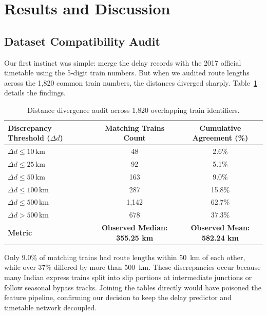 \documentclass[11pt,a4paper]{article}
\begin{document}
\section{Results and Discussion}

\subsection{Dataset Compatibility Audit}
Our first instinct was simple: merge the delay records with the 2017 official timetable using the 5-digit train numbers. But when we audited route lengths across the 1,820 common train numbers, the distances diverged sharply. Table~\ref{tab:compatibility_audit} details the findings.

\begin{table}[!ht]
\centering
\small
\caption{Distance divergence audit across 1,820 overlapping train identifiers.}
\label{tab:compatibility_audit}
\begin{tabularx}{\textwidth}{lcc}
\toprule
\textbf{Discrepancy Threshold ($\Delta d$)} & \textbf{Matching Trains Count} & \textbf{Cumulative Agreement (\%)} \\
\midrule
$\Delta d \le 10\,\mathrm{km}$ & 48 & 2.6\% \\
$\Delta d \le 25\,\mathrm{km}$ & 92 & 5.1\% \\
$\Delta d \le 50\,\mathrm{km}$ & 163 & 9.0\% \\
$\Delta d \le 100\,\mathrm{km}$ & 287 & 15.8\% \\
$\Delta d \le 500\,\mathrm{km}$ & 1,142 & 62.7\% \\
$\Delta d > 500\,\mathrm{km}$ & 678 & 37.3\% \\
\midrule
\textbf{Metric} & \textbf{Observed Median: 355.25 km} & \textbf{Observed Mean: 582.24 km} \\
\bottomrule
\end{tabularx}
\end{table}

Only 9.0\% of matching trains had route lengths within 50~km of each other, while over 37\% differed by more than 500~km. These discrepancies occur because many Indian express trains split into slip portions at intermediate junctions or follow seasonal bypass tracks. Joining the tables directly would have poisoned the feature pipeline, confirming our decision to keep the delay predictor and timetable network decoupled.
\end{document}
